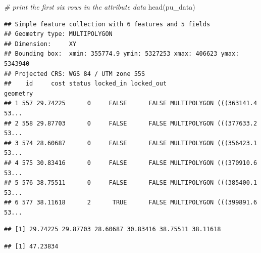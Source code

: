 \documentclass[
  12pt,
]{book}
\newenvironment{Shaded}{\begin{snugshade}}{\end{snugshade}}
\newcommand{\CommentTok}[1]{\textcolor[rgb]{0.56,0.35,0.01}{\textit{#1}}}
\newcommand{\FunctionTok}[1]{\textcolor[rgb]{0.00,0.00,0.00}{#1}}
\newcommand{\NormalTok}[1]{#1}
\newcommand{\SpecialCharTok}[1]{\textcolor[rgb]{0.00,0.00,0.00}{#1}}
\begin{document}
\begin{Shaded}
\begin{Highlighting}[]
\CommentTok{\# print the first six rows in the attribute data}
\FunctionTok{head}\NormalTok{(pu\_data)}
\end{Highlighting}
\end{Shaded}

\begin{verbatim}
## Simple feature collection with 6 features and 5 fields
## Geometry type: MULTIPOLYGON
## Dimension:     XY
## Bounding box:  xmin: 355774.9 ymin: 5327253 xmax: 406623 ymax: 5343940
## Projected CRS: WGS 84 / UTM zone 55S
##    id     cost status locked_in locked_out                       geometry
## 1 557 29.74225      0     FALSE      FALSE MULTIPOLYGON (((363141.4 53...
## 2 558 29.87703      0     FALSE      FALSE MULTIPOLYGON (((377633.2 53...
## 3 574 28.60687      0     FALSE      FALSE MULTIPOLYGON (((356423.1 53...
## 4 575 30.83416      0     FALSE      FALSE MULTIPOLYGON (((370910.6 53...
## 5 576 38.75511      0     FALSE      FALSE MULTIPOLYGON (((385400.1 53...
## 6 577 38.11618      2      TRUE      FALSE MULTIPOLYGON (((399891.6 53...
\end{verbatim}

\begin{Shaded}
\end{Shaded}

\begin{verbatim}
## [1] 29.74225 29.87703 28.60687 30.83416 38.75511 38.11618
\end{verbatim}

\begin{Shaded}
\end{Shaded}

\begin{verbatim}
## [1] 47.23834
\end{verbatim}

\begin{Shaded}
\end{Shaded}
\end{document}
